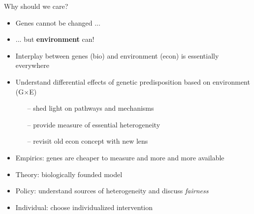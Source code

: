 \documentclass[10pt,compress,xcolor=dvipsnames,aspectratio=169]{beamer}    %
\newcounter{ex}
\newcommand{\1}[1]{\mathrm{1\hspace*{-2.5pt}l}[#1]}	%
\begin{document}
\begin{frame}{Why should we care?}\label{frame:why}

\begin{itemize}
\item Genes cannot be changed ...
\item ... but \textbf{environment} can!
\item Interplay between genes (bio) and environment (econ) is essentially everywhere \cite{Rutter2006}

\vspace{3ex}

\item Understand differential effects of genetic predisposition based on environment (G$\times$E)
\begin{enumerate}
	\item[--] shed light on pathways and mechanisms
	\item[--] provide measure of essential heterogeneity
	\item[--] revisit old econ concept with new lens
\end{enumerate}

\vspace{3ex}

\item Empirics: genes are cheaper to measure and more and more available  \hyperlink{frame:dollargenome}{\beamergotobutton{}}
\item Theory: biologically founded model
\item Policy: understand sources of heterogeneity and discuss \textit{fairness}
\item Individual: choose individualized intervention

\end{itemize}
\end{frame}

%
%
\end{document}
